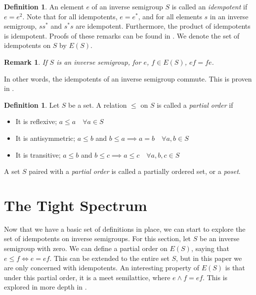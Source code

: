 \documentclass[12pt]{article}
\newtheorem{remark}[theorem]{Remark}
\theoremstyle{definition}
\newtheorem{definition}[theorem]{Definition}
\begin{document}
\begin{definition}
    An element $e$ of an inverse semigroup $S$ is called an \emph{idempotent} if
    $e = e^2$. Note that for all idempotents, $e = e^*$, and for all elements $s$ in
    an inverse semigroup, $ss^*$ and $s^*s$ are idempotent. Furthermore, 
    the product of idempotents is idempotent. Proofs of these remarks can be found
    in \parencite[Section 3]{cheaney}. We denote the set of idempotents on $S$ by $E(S)$.
\end{definition}

\begin{remark}
    If $S$ is an inverse semigroup, for $e$, $f \in E(S)$, $ef = fe$.
\end{remark}
In other words, the idempotents of an inverse semigroup commute. This is proven
in \parencite[Theorem 3.2]{cheaney}.

\begin{definition}
    Let $S$ be a set. A relation $\leq$ on $S$ is called a \emph{partial order} if
    \begin{itemize}
        \item It is reflexive; $a \leq a \quad \forall a \in S$
        \item It is antisymmetric; $a \leq b$ and $b \leq a \implies a = b \quad \forall a, b \in S$
        \item It is transitive; $a \leq b$ and $b \leq c \implies a \leq c \quad \forall a, b, c \in S$
    \end{itemize}
    A set $S$ paired with a \emph{partial order} is called a partially ordered set, or a \emph{poset}.
\end{definition}


\section{The Tight Spectrum}
Now that we have a basic set of definitions in place, we can start to explore
the set of idempotents on inverse semigroups. For this section, let $S$ be an
inverse semigroup with zero. We can define a partial order on $E(S)$, saying that $e \leq f \iff e = ef$.
This can be extended to the entire set $S$, but in this paper we are only concerned with idempotents.
An interesting property of $E(S)$ is that under this partial order, it is a meet semilattice, where
$e \land f = ef$. This is explored in more depth in \parencite{lawson}.
\end{document}
